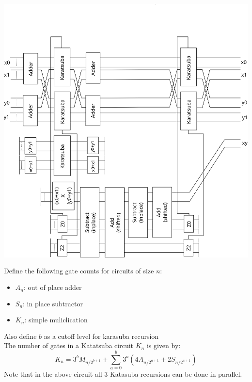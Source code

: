 \documentclass{article}
\begin{document}
  \begin{center}
    \includegraphics[scale=0.24]{karatsubaDiagram} 
  \end{center}

  Define the following gate counts for circuits of size $n$:
  \begin{itemize}
   \item $A_n$: out of place adder 
   \item $S_n$: in place subtractor 
   \item $K_n$: simple muliclication
  \end{itemize} 
  Also define $b$ as a cutoff level for karasuba recursion \\
  The number of gates in a Katatsuba circuit $K_n$ is given by:
  \[ K_n = 3^bM_{n/2^{b+1}} + \sum_{a=0}^{b} 3^a\left( 4A_{n/2^{a+1}} + 2S_{n/2^{a+1}}  \right)  \] 
	Note that in the above circuit all 3 Katasuba recursions can be done in parallel.
\end{document}
